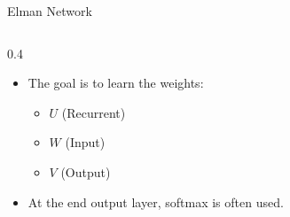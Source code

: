 \documentclass[aspectratio=169,xcolor=dvipsnames,svgnames,x11names,fleqn]{beamer}
\begin{document}
\begin{frame}[fragile]{Elman Network}
\begin{columns}[T]
        \begin{column}{0.4\textwidth}
            \vspace{10pt}
            \begin{itemize}
                \item[\textcolor{rnnCoral}{\faBullseye}] 
                \small
                The goal is to learn the weights:
                \begin{itemize}
                    \item \textcolor{rnnNavy}{\textbf{$U$}} (Recurrent)
                    \item \textcolor{rnnNavy}{\textbf{$W$}} (Input)
                    \item \textcolor{rnnNavy}{\textbf{$V$}} (Output)
                \end{itemize}
                
                \vspace{15pt}
                \item[\textcolor{rnnBlue}{\faInfoCircle}] 
                \small
                At the end output layer, softmax is often used.
            \end{itemize}
        \end{column}
    \end{columns}
\end{frame}
\end{document}
